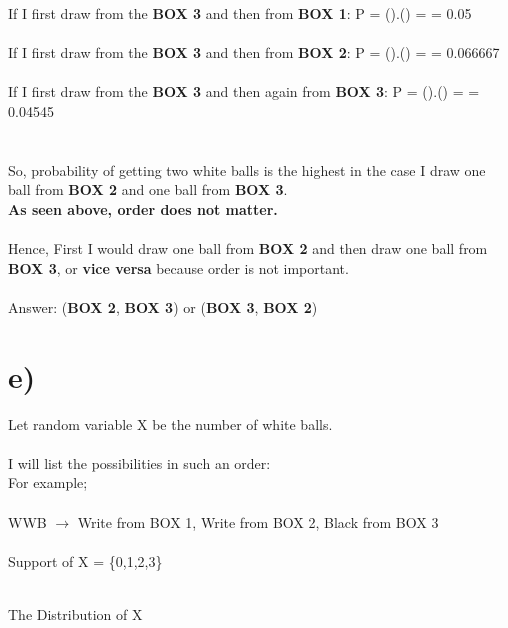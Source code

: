 \documentclass[11pt]{article}
\begin{document}
\noindent If I first draw from the \textbf{BOX 3} and then from \textbf{BOX 1}: \space
P = ().() =  = 0.05 \\ \\

\noindent If I first draw from the \textbf{BOX 3} and then from \textbf{BOX 2}: \space
P = ().() =  = 0.066667 \\ \\

\noindent If I first draw from the \textbf{BOX 3} and then again from \textbf{BOX 3}: \space
P = ().() =  = 0.04545 \\ \\ \\ 

So, probability of getting two white balls is the highest in the case I draw one
ball from \textbf{BOX 2} and one ball from \textbf{BOX 3}. \\

\textbf{As seen above, order does not matter. } \\ \\
Hence, First I would draw one ball from \textbf{BOX 2} and then draw one ball from
\textbf{BOX 3}, or \textbf{vice versa} because order is not important.  \\ \\

\noindent Answer: (\textbf{BOX 2}, \textbf{BOX 3}) or (\textbf{BOX 3}, \textbf{BOX 2})
\newpage

\section*{e)}
Let random variable X be the number of white balls. \\ \\
I will list the possibilities in such an order: \\
For example; \\ \\
WWB $\longrightarrow$ Write from BOX 1, Write from BOX 2, Black from BOX 3 \\ \\
Support of X = \{0,1,2,3\} \\ \\

\begin{center}
    The Distribution of X
\end{center} \\ 
\end{document}
